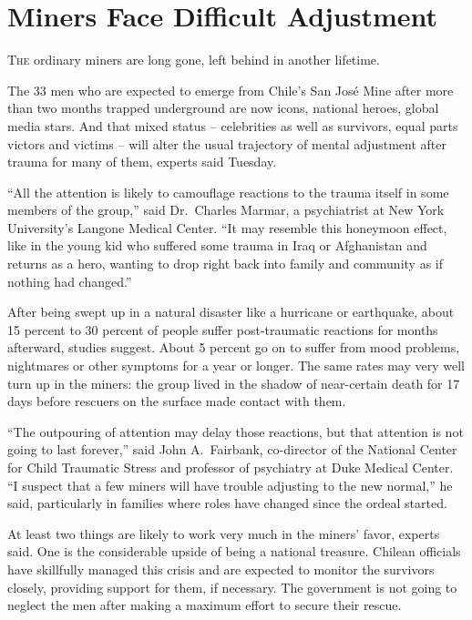 ﻿\documentclass[12pt]{article}
\begin{document}
\section{Miners Face Difficult Adjustment}

\lettrine{T}{he} ordinary miners are long gone, left behind in another
lifetime.

The 33 men who are expected to emerge from Chile's San Jos\'e Mine after more than two months
trapped underground are now icons, national heroes, global media stars. And that mixed status --
celebrities as well as survivors, equal parts victors and victims -- will alter the usual trajectory
of mental adjustment after trauma for many of them, experts said Tuesday.

``All the attention is likely to camouflage reactions to the trauma itself in some members of the
group,'' said Dr.~Charles Marmar, a psychiatrist at New York University's Langone Medical Center.
``It may resemble this honeymoon effect, like in the young kid who suffered some trauma in Iraq or
Afghanistan and returns as a hero, wanting to drop right back into family and community as if
nothing had changed.''

After being swept up in a natural disaster like a hurricane or earthquake, about 15 percent to 30
percent of people suffer post-traumatic reactions for months afterward, studies suggest. About 5
percent go on to suffer from mood problems, nightmares or other symptoms for a year or longer. The
same rates may very well turn up in the miners: the group lived in the shadow of near-certain death
for 17 days before rescuers on the surface made contact with them.

``The outpouring of attention may delay those reactions, but that attention is not going to last
forever,'' said John A.~Fairbank, co-director of the National Center for Child Traumatic Stress and
professor of psychiatry at Duke Medical Center. ``I suspect that a few miners will have trouble
adjusting to the new normal,'' he said, particularly in families where roles have changed since the
ordeal started.

At least two things are likely to work very much in the miners' favor, experts said. One is the
considerable upside of being a national treasure. Chilean officials have skillfully managed this
crisis and are expected to monitor the survivors closely, providing support for them, if necessary.
The government is not going to neglect the men after making a maximum effort to secure their rescue.
\end{document}
